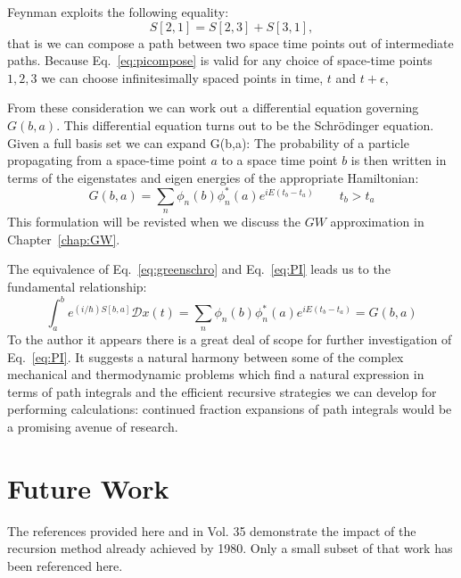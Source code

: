 Feynman exploits the following equality:
%
\begin{equation}
\label{eq:picompose}
S[2,1] = S[2,3] + S[3,1],
\end{equation}
%
that is we can compose a path between two space time points out of intermediate paths.
Because Eq.~\ref{eq:picompose} is valid for any choice of space-time points $1,2,3$
we can choose infinitesimally spaced points in time, $t$ and $t+\epsilon$, 

From these consideration we can work out a differential equation governing
$G(b,a)$. This differential equation turns out to be the Schr\"odinger equation.
Given a full basis set we can expand G(b,a):
The probability of a particle propagating from a space-time point $a$ to a space time point
$b$ is then written in terms of the eigenstates and eigen energies of the appropriate Hamiltonian:
%
\begin{equation}
G(b,a) = \sum_{n} \phi_{n}(b)\phi_{n}^{*}(a)e^{iE(t_b - t_a)} \qquad t_b>t_a
\end{equation}
%
This formulation will be revisted when we discuss the $GW$ approximation in Chapter~\ref{chap:GW}.

The equivalence of Eq.~\ref{eq:greenschro} and Eq.~\ref{eq:PI} leads us to the fundamental relationship:
%
\begin{equation}
\label{eq:PI}
	\int_{a}^{b} e^{(i/\hbar)S[b,a]} \mathcal{D}x(t) = \sum_{n} \phi_{n}(b)\phi_{n}^{*}(a)e^{iE(t_b - t_a)} = G(b,a)
\end{equation}
%
To the author it appears there is a great deal of scope for further investigation of Eq.~\ref{eq:PI}. 
It suggests a natural harmony between some of the complex mechanical and thermodynamic problems
which find a natural expression in terms of path integrals and the efficient recursive
strategies we can develop for performing calculations: continued fraction expansions of
path integrals would be a promising avenue of research.

\section{Future Work}
The references provided here and in Vol. 35 demonstrate the impact of
the recursion method already achieved by 1980. Only a small subset of that
work has been referenced here. 


